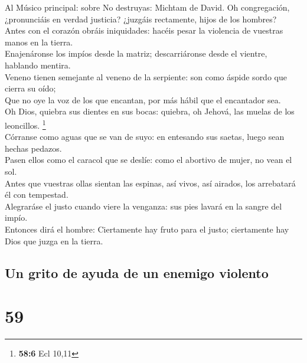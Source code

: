  Al Músico principal: sobre No destruyas: Michtam de
David. Oh congregación, ¿pronunciáis en verdad justicia? ¿juzgáis
rectamente, hijos de los hombres?\\
 Antes con el corazón obráis iniquidades: hacéis pesar la
violencia de vuestras manos en la tierra.\\
 Enajenáronse los impíos desde la matriz; descarriáronse
desde el vientre, hablando mentira.\\
 Veneno tienen semejante al veneno de la serpiente: son
como áspide sordo que cierra su oído;\\
 Que no oye la voz de los que encantan, por más hábil que
el encantador sea.\\
 Oh Dios, quiebra sus dientes en sus bocas: quiebra, oh
Jehová, las muelas de los leoncillos. \footnote{\textbf{58:6} Ecl 10,11}\\
 Córranse como aguas que se van de suyo: en entesando sus
saetas, luego sean hechas pedazos.\\
 Pasen ellos como el caracol que se deslíe: como el
abortivo de mujer, no vean el sol.\\
 Antes que vuestras ollas sientan las espinas, así vivos,
así airados, los arrebatará él con tempestad.\\
 Alegraráse el justo cuando viere la venganza: sus pies
lavará en la sangre del impío.\\
 Entonces dirá el hombre: Ciertamente hay fruto para el
justo; ciertamente hay Dios que juzga en la tierra.

\hypertarget{un-grito-de-ayuda-de-un-enemigo-violento}{%
\subsection{Un grito de ayuda de un enemigo
violento}\label{un-grito-de-ayuda-de-un-enemigo-violento}}

\hypertarget{section-58}{%
\section{59}\label{section-58}}

